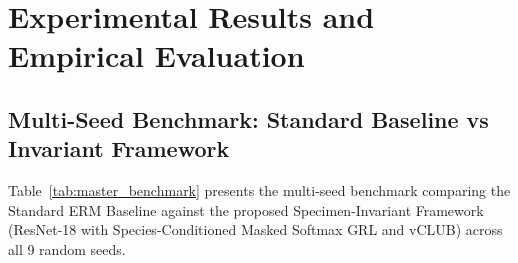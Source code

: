 \documentclass[a4paper,fleqn]{cas-sc}
\begin{document}
\section{Experimental Results and Empirical Evaluation}
\label{sec:experiments}

\subsection{Multi-Seed Benchmark: Standard Baseline vs Invariant Framework}
Table~\ref{tab:master_benchmark} presents the multi-seed benchmark comparing the Standard ERM Baseline against the proposed Specimen-Invariant Framework (ResNet-18 with Species-Conditioned Masked Softmax GRL and vCLUB) across all 9 random seeds.
\end{document}

